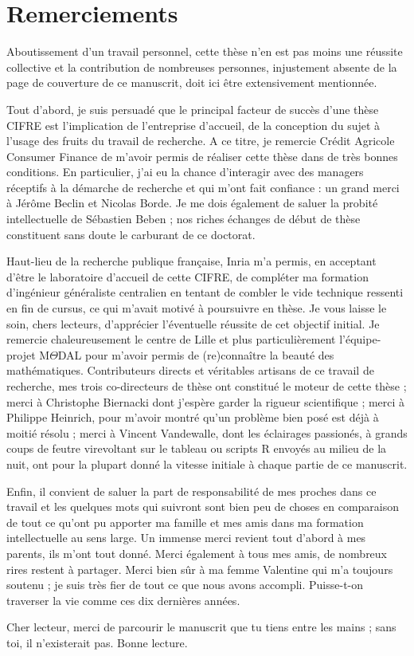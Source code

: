 \chapter{Remerciements}

Aboutissement d'un travail personnel, cette thèse n'en est pas moins une réussite collective et la contribution de nombreuses personnes, injustement absente de la page de couverture de ce manuscrit, doit ici être extensivement mentionnée.

Tout d'abord, je suis persuadé que le principal facteur de succès d'une thèse CIFRE est l'implication de l'entreprise d'accueil, de la conception du sujet à l'usage des fruits du travail de recherche. A ce titre, je remercie Crédit Agricole Consumer Finance de m'avoir permis de réaliser cette thèse dans de très bonnes conditions. En particulier, j'ai eu la chance d'interagir avec des managers réceptifs à la démarche de recherche et qui m'ont fait confiance : un grand merci à Jérôme Beclin et Nicolas Borde. Je me dois également de saluer la probité intellectuelle de Sébastien Beben ; nos riches échanges de début de thèse constituent sans doute le carburant de ce doctorat.

Haut-lieu de la recherche publique française, Inria m'a permis, en acceptant d'être le laboratoire d'accueil de cette CIFRE, de compléter ma formation d'ingénieur généraliste centralien en tentant de combler le vide technique ressenti en fin de cursus, ce qui m'avait motivé à poursuivre en thèse. Je vous laisse le soin, chers lecteurs, d'apprécier l'éventuelle réussite de cet objectif initial. Je remercie chaleureusement le centre de Lille et plus particulièrement l'équipe-projet M$\Theta$DAL pour m'avoir permis de (re)connaître la beauté des mathématiques. Contributeurs directs et véritables artisans de ce travail de recherche, mes trois co-directeurs de thèse ont constitué le moteur de cette thèse ; merci à Christophe Biernacki dont j'espère garder la rigueur scientifique ; merci à Philippe Heinrich, pour m'avoir montré qu'un problème bien posé est déjà à moitié résolu ; merci à Vincent Vandewalle, dont les éclairages passionés, à grands coups de feutre virevoltant sur le tableau ou scripts \textsf{R} envoyés au milieu de la nuit, ont pour la plupart donné la vitesse initiale à chaque partie de ce manuscrit.

Enfin, il convient de saluer la part de responsabilité de mes proches dans ce travail et les quelques mots qui suivront sont bien peu de choses en comparaison de tout ce qu'ont pu apporter ma famille et mes amis dans ma formation intellectuelle au sens large. Un immense merci revient tout d'abord à mes parents, ils m'ont tout donné. Merci également à tous mes amis, de nombreux rires restent à partager. Merci bien sûr à ma femme Valentine
qui m'a toujours soutenu ; je suis très fier de tout ce que nous avons accompli. Puisse-t-on traverser la vie comme ces dix dernières années.

Cher lecteur, merci de parcourir le manuscrit que tu tiens entre les mains ; sans toi, il n'existerait pas. Bonne lecture.